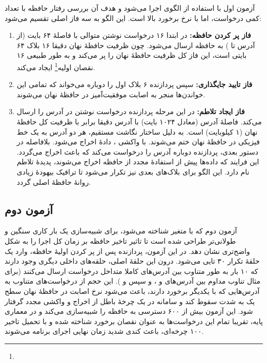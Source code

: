 آزمون اول با استفاده از الگوی  اجرا می‌شود و هدف آن بررسی رفتار حافظه با تعداد کمی درخواست، اما با نرخ برخورد بالا است. این الگو به سه فاز اصلی تقسیم می‌شود:
\begin{enumerate}
	\item \textbf{فاز پر کردن حافظه:} در ابتدا ۱۶ درخواست نوشتن متوالی با فاصلهٔ ۶۴ بایت (از آدرس  تا ) به حافظه ارسال می‌شود. چون ظرفیت حافظهٔ نهان دقیقا ۱۶ بلاک ۶۴ بایتی است، این فاز کل ظرفیت حافظهٔ نهان را پر می‌کند و به طور طبیعی ۱۶ نقصان اولیه\footnote{} ایجاد می‌کند.
	\item \textbf{فاز تایید جایگذاری:} سپس پردازنده ۶ بلاک اول را دوباره می‌خواند که تمامی این خواندن‌ها منجر به اصابت موفقیت‌آمیز در حافظهٔ نهان می‌شوند.
	\item \textbf{فاز ایجاد تلاطم:} در این مرحله پردازنده درخواست نوشتن در آدرس  را ارسال می‌کند. فاصلهٔ آدرس  (معادل ۱۰۲۴ بایت) با آدرس  دقیقا برابر با ظرفیت کل حافظهٔ نهان (۱ کیلوبایت) است. به دلیل ساختار نگاشت مستقیم، هر دو آدرس به یک خط فیزیکی در حافظهٔ نهان ختم می‌شوند. با واکشی ، دادهٔ  اخراج می‌شود. بلافاصله در دستور بعدی، پردازنده دوباره آدرس  را درخواست می‌کند که باعث اخراج  می‌گردد. این فرایند که داده‌ها پیش از استفادهٔ مجدد از حافظه اخراج می‌شوند، پدیدهٔ تلاطم نام دارد. این الگو برای بلاک‌های بعدی نیز تکرار می‌شود تا ترافیک بیهودهٔ زیادی روانهٔ حافظهٔ اصلی گردد.
\end{enumerate}

\subsection{آزمون دوم}

آزمون دوم که با متغیر  شناخته می‌شود، برای شبیه‌سازی یک بار کاری سنگین و طولانی‌تر طراحی شده است تا تاثیر تاخیر حافظه بر زمان کل اجرا را به شکل واضح‌تری نشان دهد.
در این آزمون، پردازنده پس از پر کردن اولیهٔ حافظه، وارد یک حلقهٔ تکرار ۳۰ تایی می‌شود. درون این حلقهٔ اصلی، حلقه‌های داخلی دیگری وجود دارند که ۱۰ بار به طور متناوب بین آدرس‌های کاملا متداخل درخواست ارسال می‌کنند (برای مثال تناوب مداوم بین آدرس‌های  و ، و سپس  و ). 
این حجم از درخواست‌های متناوب به آدرس‌هایی که با یکدیگر برخورد دارند، باعث می‌شود نرخ اصابت در حافظهٔ نهان سطح یک به شدت سقوط کند و سامانه در یک چرخهٔ باطل از اخراج و واکشی مجدد گرفتار شود. این آزمون بیش از ۶۰۰ دسترسی به حافظه را شبیه‌سازی می‌کند و در معماری پایه، تقریبا تمام این درخواست‌ها به عنوان نقصان برخورد شناخته شده و با تحمیل تاخیر ۱۰۰ چرخه‌ای، باعث کندی شدید زمان نهایی اجرای برنامه می‌شوند.